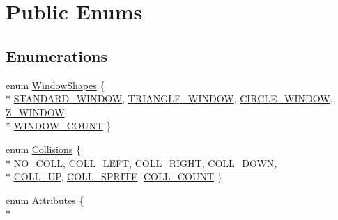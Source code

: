 \hypertarget{group___enums}{\section{Public Enums}
\label{group___enums}
}
\subsection*{Enumerations}
\begin{DoxyCompactItemize}
\item 
enum \hyperlink{group___enums_ga1751d752420f5a0e2cbae03bb6ddf755}{Window\-Shapes} \{ \\*
\hyperlink{group___enums_gga1751d752420f5a0e2cbae03bb6ddf755ab6bcfa94242a2ec7d26734edf69943f9}{S\-T\-A\-N\-D\-A\-R\-D\-\_\-\-W\-I\-N\-D\-O\-W}, 
\hyperlink{group___enums_gga1751d752420f5a0e2cbae03bb6ddf755a6b59d7b5a52b311d87bd3a72a20d0a46}{T\-R\-I\-A\-N\-G\-L\-E\-\_\-\-W\-I\-N\-D\-O\-W}, 
\hyperlink{group___enums_gga1751d752420f5a0e2cbae03bb6ddf755a0545316f663a457a486823c9a70cd63b}{C\-I\-R\-C\-L\-E\-\_\-\-W\-I\-N\-D\-O\-W}, 
\hyperlink{group___enums_gga1751d752420f5a0e2cbae03bb6ddf755ace02e22ec7b8cd7b5d685a4fde56a68c}{Z\-\_\-\-W\-I\-N\-D\-O\-W}, 
\\*
\hyperlink{group___enums_gga1751d752420f5a0e2cbae03bb6ddf755a00e20caeb65567d540c094f89507b9fa}{W\-I\-N\-D\-O\-W\-\_\-\-C\-O\-U\-N\-T}
 \}
\item 
enum \hyperlink{group___enums_gac229809d578f8efa7f10bcceb8ed23b8}{Collisions} \{ \\*
\hyperlink{group___enums_ggac229809d578f8efa7f10bcceb8ed23b8a8b6c7ec7dc1deae70ee2ddc39314c313}{N\-O\-\_\-\-C\-O\-L\-L}, 
\hyperlink{group___enums_ggac229809d578f8efa7f10bcceb8ed23b8a8df8f9f879211129c58be95f0b536a57}{C\-O\-L\-L\-\_\-\-L\-E\-F\-T}, 
\hyperlink{group___enums_ggac229809d578f8efa7f10bcceb8ed23b8a6d1b0aade38457d5bcb9d9d9b2017ed6}{C\-O\-L\-L\-\_\-\-R\-I\-G\-H\-T}, 
\hyperlink{group___enums_ggac229809d578f8efa7f10bcceb8ed23b8a09d1cb055ad55b791473cf93b06c07c3}{C\-O\-L\-L\-\_\-\-D\-O\-W\-N}, 
\\*
\hyperlink{group___enums_ggac229809d578f8efa7f10bcceb8ed23b8a9166a9d8586754f3ea28e9330e146e27}{C\-O\-L\-L\-\_\-\-U\-P}, 
\hyperlink{group___enums_ggac229809d578f8efa7f10bcceb8ed23b8a9667b50ac3bf95d5122d4161c67316bd}{C\-O\-L\-L\-\_\-\-S\-P\-R\-I\-T\-E}, 
\hyperlink{group___enums_ggac229809d578f8efa7f10bcceb8ed23b8a271d92f5d871fc7caa098f9afb33d7b8}{C\-O\-L\-L\-\_\-\-C\-O\-U\-N\-T}
 \}
\item 
enum \hyperlink{group___enums_gaba562c78ac07e109b671de8a896e82fd}{Attributes} \{ \\*

\end{DoxyCompactItemize}
